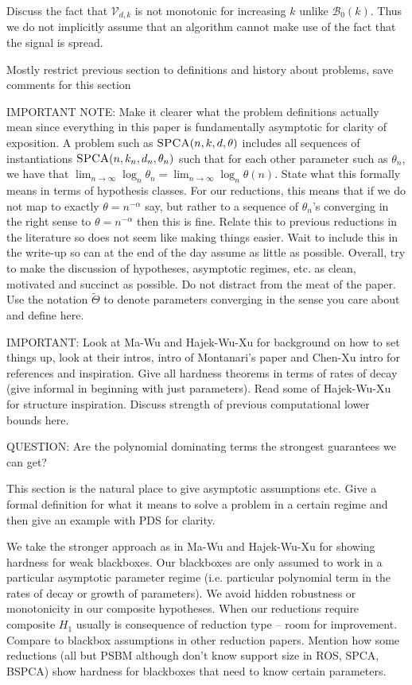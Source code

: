 \documentclass[11pt]{article}
\begin{document}
Discuss the fact that $\mathcal{V}_{d, k}$ is not monotonic for increasing $k$ unlike $\mathcal{B}_0(k)$. Thus we do not implicitly assume that an algorithm cannot make use of the fact that the signal is spread.

Mostly restrict previous section to definitions and history about problems, save comments for this section

IMPORTANT NOTE: Make it clearer what the problem definitions actually mean since everything in this paper is fundamentally asymptotic for clarity of exposition. A problem such as $\textsc{SPCA}(n, k, d, \theta)$ includes all sequences of instantiations $\textsc{SPCA}(n, k_n, d_n, \theta_n)$ such that for each other parameter such as $\theta_n$, we have that $\lim_{n \to \infty} \log_n \theta_n = \lim_{n \to \infty} \log_n \theta(n)$. State what this formally means in terms of hypothesis classes. For our reductions, this means that if we do not map to exactly $\theta = n^{-\alpha}$ say, but rather to a sequence of $\theta_n$'s converging in the right sense to $\theta = n^{-\alpha}$ then this is fine. Relate this to previous reductions in the literature so does not seem like making things easier. Wait to include this in the write-up so can at the end of the day assume as little as possible. Overall, try to make the discussion of hypotheses, asymptotic regimes, etc. as clean, motivated and succinct as possible. Do not distract from the meat of the paper. Use the notation $\tilde{\Theta}$ to denote parameters converging in the sense you care about and define here.

IMPORTANT: Look at Ma-Wu and Hajek-Wu-Xu for background on how to set things up, look at their intros, intro of Montanari's paper and Chen-Xu intro for references and inspiration. Give all hardness theorems in terms of rates of decay (give informal in beginning with just parameters). Read some of Hajek-Wu-Xu for structure inspiration. Discuss strength of previous computational lower bounds here.

QUESTION: Are the polynomial dominating terms the strongest guarantees we can get?

This section is the natural place to give asymptotic assumptions etc. Give a formal definition for what it means to solve a problem in a certain regime and then give an example with PDS for clarity.

We take the stronger approach as in Ma-Wu and Hajek-Wu-Xu for showing hardness for weak blackboxes. Our blackboxes are only assumed to work in a particular asymptotic parameter regime (i.e. particular polynomial term in the rates of decay or growth of parameters). We avoid hidden robustness or monotonicity in our composite hypotheses. When our reductions require composite $H_1$ usually is consequence of reduction type -- room for improvement. Compare to blackbox assumptions in other reduction papers. Mention how some reductions (all but PSBM although don't know support size in ROS, SPCA, BSPCA) show hardness for blackboxes that need to know certain parameters.
\end{document}
